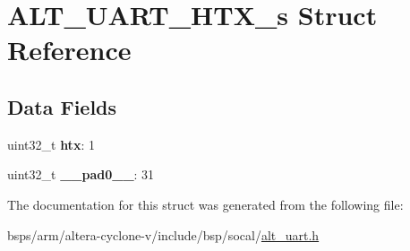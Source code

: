 \hypertarget{structALT__UART__HTX__s}{}\section{A\+L\+T\+\_\+\+U\+A\+R\+T\+\_\+\+H\+T\+X\+\_\+s Struct Reference}
\label{structALT__UART__HTX__s}
\subsection*{Data Fields}
\begin{DoxyCompactItemize}
\item 
\mbox{\label{structALT__UART__HTX__s_ad028207ad880d21a84a1cc9eb4e04665}} 
uint32\+\_\+t {\bfseries htx}\+: 1
\item 
\mbox{\label{structALT__UART__HTX__s_a8a341296f031d1943de194308ad1d8a8}} 
uint32\+\_\+t {\bfseries \+\_\+\+\_\+pad0\+\_\+\+\_\+}\+: 31
\end{DoxyCompactItemize}


The documentation for this struct was generated from the following file\+:\begin{DoxyCompactItemize}
\item 
bsps/arm/altera-\/cyclone-\/v/include/bsp/socal/\mbox{\hyperlink{alt__uart_8h}{alt\+\_\+uart.\+h}}\end{DoxyCompactItemize}
